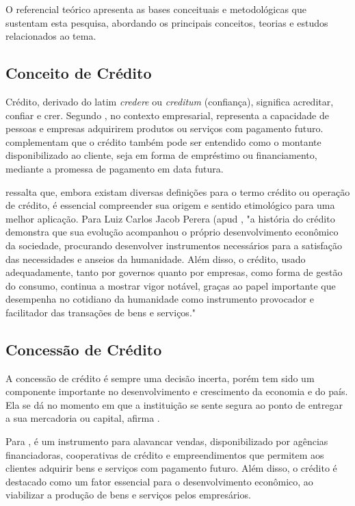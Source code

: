 \documentclass[12pt,a4paper]{article}
\begin{document}
O referencial teórico apresenta as bases conceituais e metodológicas que sustentam esta pesquisa, abordando os principais conceitos, teorias e estudos relacionados ao tema.

\subsection{Conceito de Crédito}
Crédito, derivado do latim \textit{credere} ou \textit{creditum} (confiança), significa acreditar, confiar e crer. Segundo \cite{rossato2020}, no contexto empresarial, representa a capacidade de pessoas e empresas adquirirem produtos ou serviços com pagamento futuro. \cite{Cardoso2024} complementam que o crédito também pode ser entendido como o montante disponibilizado ao cliente, seja em forma de empréstimo ou financiamento, mediante a promessa de pagamento em data futura.

\cite{ALEXANDRE2003} ressalta que, embora existam diversas definições para o termo crédito ou operação de crédito, é essencial compreender sua origem e sentido etimológico para uma melhor aplicação. Para Luiz Carlos Jacob Perera (apud \cite{ALEXANDRE2003}, "a história do crédito demonstra que sua evolução acompanhou o próprio desenvolvimento econômico da sociedade, procurando desenvolver instrumentos necessários para a satisfação das necessidades e anseios da humanidade. Além disso, o crédito, usado adequadamente, tanto por governos quanto por empresas, como forma de gestão do consumo, continua a mostrar vigor notável, graças ao papel importante que desempenha no cotidiano da humanidade como instrumento provocador e facilitador das transações de bens e serviços."
\subsection{Concessão de Crédito}

A concessão de crédito é sempre uma decisão incerta, porém tem sido um componente importante no desenvolvimento e crescimento da economia e do país. Ela se dá no momento em que a instituição se sente segura ao ponto de entregar a sua mercadoria ou capital, afirma \cite{beserra2022}. 

Para \cite{rossato2020}, é um instrumento para alavancar vendas, disponibilizado por agências financiadoras, cooperativas de crédito e empreendimentos que permitem aos clientes adquirir bens e serviços com pagamento futuro. Além disso, o crédito é destacado como um fator essencial para o desenvolvimento econômico, ao viabilizar a produção de bens e serviços pelos empresários. 
\end{document}
